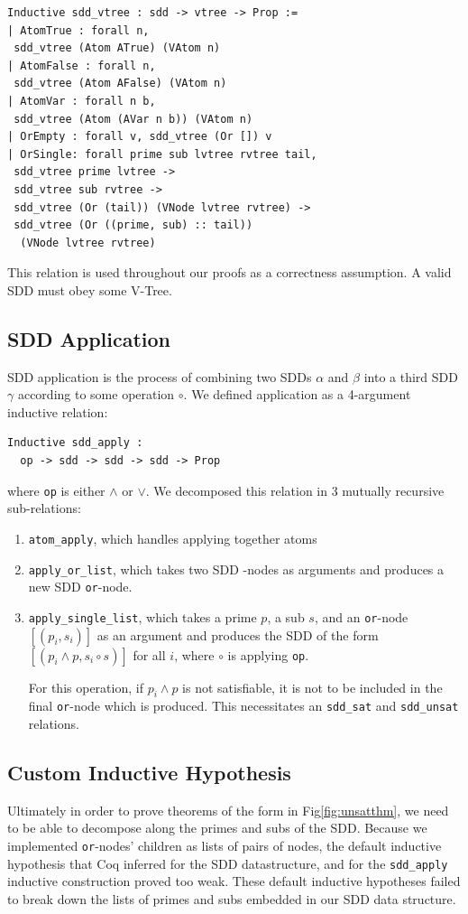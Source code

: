 \documentclass[twocolumn]{article}
\theoremstyle{definition}
\begin{document}
\begin{verbatim}
Inductive sdd_vtree : sdd -> vtree -> Prop :=
| AtomTrue : forall n, 
 sdd_vtree (Atom ATrue) (VAtom n)
| AtomFalse : forall n, 
 sdd_vtree (Atom AFalse) (VAtom n)
| AtomVar : forall n b, 
 sdd_vtree (Atom (AVar n b)) (VAtom n)
| OrEmpty : forall v, sdd_vtree (Or []) v
| OrSingle: forall prime sub lvtree rvtree tail, 
 sdd_vtree prime lvtree ->
 sdd_vtree sub rvtree ->
 sdd_vtree (Or (tail)) (VNode lvtree rvtree) ->
 sdd_vtree (Or ((prime, sub) :: tail)) 
  (VNode lvtree rvtree)

\end{verbatim}

This relation is used throughout our proofs as a correctness assumption. A valid SDD must obey some V-Tree.

\subsection{SDD Application}
SDD application is the process of combining two SDDs $\alpha$ and $\beta$ into a
third SDD $\gamma$ according to some operation $\circ$. We defined application
as a 4-argument inductive relation:
\begin{verbatim}
Inductive sdd_apply : 
  op -> sdd -> sdd -> sdd -> Prop
\end{verbatim}

where \texttt{op} is either $\land$ or $\lor$. We decomposed this relation in 3
mutually recursive sub-relations:
\begin{enumerate}
\item \texttt{atom\_apply}, which handles applying together atoms
\item \texttt{apply\_or\_list}, which takes two SDD -nodes as arguments and
  produces a new SDD \texttt{or}-node.
\item \texttt{apply\_single\_list}, which takes a prime $p$, a sub $s$, and an
  \texttt{or}-node $[(p_i, s_i)]$ as an argument and produces the SDD of the
  form $[(p_i \land p, s_i \circ s)]$ for all $i$, where $\circ$ is applying
  \texttt{op}.

  For this operation, if $p_i \land p$ is not satisfiable, it is not to be
  included in the final \texttt{or}-node which is produced. This necessitates
  an \texttt{sdd\_sat} and \texttt{sdd\_unsat} relations.
\end{enumerate}

\subsection{Custom Inductive Hypothesis}
Ultimately in order to prove theorems of the form in Fig\ref{fig:unsatthm}, we
need to be able to decompose along the primes and subs of the SDD. Because we implemented \texttt{or}-nodes' children as lists of pairs of nodes, the default inductive hypothesis that Coq inferred for the SDD datastructure, and for the \texttt{sdd\_apply} inductive construction proved too weak. These default inductive hypotheses failed to break down the lists of primes and subs embedded in our SDD data structure.
\end{document}
